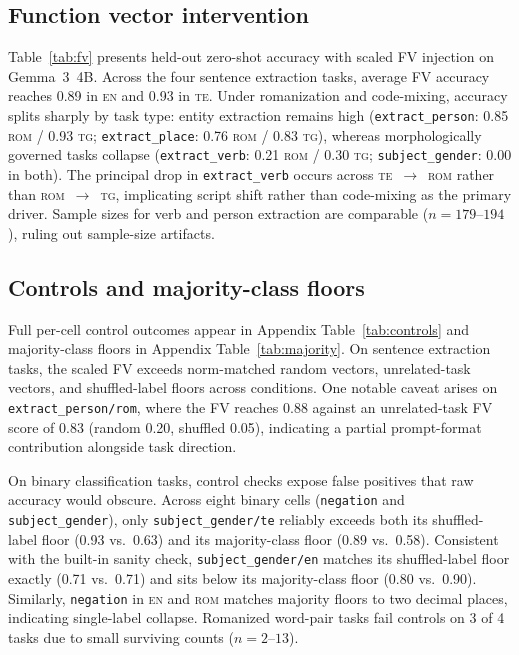 \documentclass[11pt]{article}
\newcommand{\cond}[1]{\textsc{#1}}
\begin{document}
\subsection{Function vector intervention}
\label{sec:fv}

Table~\ref{tab:fv} presents held-out zero-shot accuracy with scaled FV
injection on Gemma~3~4B. Across the four sentence extraction tasks, average FV
accuracy reaches 0.89 in \cond{en} and 0.93 in \cond{te}. Under romanization
and code-mixing, accuracy splits sharply by task type: entity extraction
remains high (\texttt{extract\_person}: 0.85 \cond{rom} / 0.93 \cond{tg};
\texttt{extract\_place}: 0.76 \cond{rom} / 0.83 \cond{tg}), whereas
morphologically governed tasks collapse (\texttt{extract\_verb}: 0.21
\cond{rom} / 0.30 \cond{tg}; \texttt{subject\_gender}: 0.00 in both). The
principal drop in \texttt{extract\_verb} occurs across \cond{te}~$\to$~\cond{rom}
rather than \cond{rom}~$\to$~\cond{tg}, implicating script shift rather than
code-mixing as the primary driver. Sample sizes for verb and person extraction
are comparable ($n = 179$--$194$), ruling out sample-size artifacts.

\begin{table}[t]
\centering
\small
\caption{Held-out zero-shot accuracy with scaled function vector injection and
  95\% bootstrap confidence intervals (\texttt{core} tier, Gemma~3~4B).}
\label{tab:fv}
\end{table}

\subsection{Controls and majority-class floors}
\label{sec:controls}

Full per-cell control outcomes appear in Appendix Table~\ref{tab:controls} and
majority-class floors in Appendix Table~\ref{tab:majority}. On sentence
extraction tasks, the scaled FV exceeds norm-matched random vectors,
unrelated-task vectors, and shuffled-label floors across conditions. One
notable caveat arises on \texttt{extract\_person/rom}, where the FV reaches
0.88 against an unrelated-task FV score of 0.83 (random 0.20, shuffled 0.05),
indicating a partial prompt-format contribution alongside task direction.

On binary classification tasks, control checks expose false positives that raw
accuracy would obscure. Across eight binary cells (\texttt{negation} and
\texttt{subject\_gender}), only \texttt{subject\_gender/te} reliably exceeds
both its shuffled-label floor (0.93 vs.\ 0.63) and its majority-class floor
(0.89 vs.\ 0.58). Consistent with the built-in sanity check,
\texttt{subject\_gender/en} matches its shuffled-label floor exactly (0.71 vs.\
0.71) and sits below its majority-class floor (0.80 vs.\ 0.90). Similarly,
\texttt{negation} in \cond{en} and \cond{rom} matches majority floors to two
decimal places, indicating single-label collapse. Romanized word-pair tasks
fail controls on 3 of 4 tasks due to small surviving counts ($n = 2$--$13$).
\end{document}
